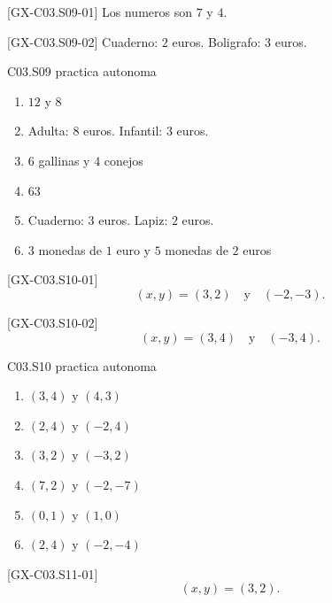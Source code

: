\begin{shortanswer}{[GX-C03.S09-01]}
Los numeros son \(7\) y \(4\).
\end{shortanswer}

\begin{shortanswer}{[GX-C03.S09-02]}
Cuaderno: \(2\) euros. Boligrafo: \(3\) euros.
\end{shortanswer}

\begin{shortanswer}{C03.S09 practica autonoma}
\begin{enumerate}[label=\textbf{PX-C03.S09-\arabic*:}, leftmargin=*]
  \item \(12\) y \(8\)
  \item Adulta: \(8\) euros. Infantil: \(3\) euros.
  \item \(6\) gallinas y \(4\) conejos
  \item \(63\)
  \item Cuaderno: \(3\) euros. Lapiz: \(2\) euros.
  \item \(3\) monedas de \(1\) euro y \(5\) monedas de \(2\) euros
\end{enumerate}
\end{shortanswer}

\begin{shortanswer}{[GX-C03.S10-01]}
\[
(x,y)=(3,2)\quad \text{y}\quad (-2,-3).
\]
\end{shortanswer}

\begin{shortanswer}{[GX-C03.S10-02]}
\[
(x,y)=(3,4)\quad \text{y}\quad (-3,4).
\]
\end{shortanswer}

\begin{shortanswer}{C03.S10 practica autonoma}
\begin{enumerate}[label=\textbf{PX-C03.S10-\arabic*:}, leftmargin=*]
  \item \((3,4)\) y \((4,3)\)
  \item \((2,4)\) y \((-2,4)\)
  \item \((3,2)\) y \((-3,2)\)
  \item \((7,2)\) y \((-2,-7)\)
  \item \((0,1)\) y \((1,0)\)
  \item \((2,4)\) y \((-2,-4)\)
\end{enumerate}
\end{shortanswer}

\begin{shortanswer}{[GX-C03.S11-01]}
\[
(x,y)=(3,2).
\]
\end{shortanswer}


